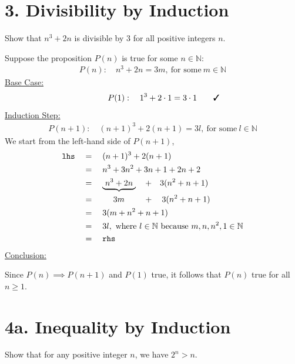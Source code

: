 \documentclass[12pt]{article}
\begin{document}
\clearpage
\section*{3. Divisibility by Induction}
\begin{question}
Show that $n^{3}+2n$ is divisible by $3$ for all positive integers $n$. 
\end{question}

Suppose the proposition $P(n)$ is true for some $n\in\mathbb{N}$: 
\begin{align*}
P(n): \quad n^{3}+2n = 3m, ~\text{for some}~m\in\mathbb{N}
\end{align*}
\underline{Base Case:}
\begin{align*}
P(1): \quad
  1^{3} + 2\cdot 1 = 3 \cdot 1 \mathrlap{\qquad \cmark}
\end{align*}
\underline{Induction Step:}
\begin{align*}
P(n+1): \quad
  (n+1)^{3}+2(n+1) = 3l, ~\text{for some}~l\in\mathbb{N}
\end{align*}
We start from the left-hand side of $P(n+1)$,
\begin{align*}
\texttt{lhs} \quad
& = \quad (n+1)^{3} + 2(n+1) \\
& = \quad n^{3} + 3n^{2} + 3n + 1 + 2n + 2 \\
& = \quad \underbrace{~n^{3} + 2n~} \quad+\quad 3(n^{2}+n+1) \\
& = \quad \makebox[4em]{$3m$} \quad+\quad 3(n^{2}+n+1) \\
& = \quad 3 (m+n^{2}+n+1) \\
& = \quad 3l, ~\text{where}~l\in\mathbb{N}~\text{because}~m,n,n^{2},1\in\mathbb{N} \\
& = \quad \texttt{rhs}
\end{align*}
\underline{Conclusion:}

Since $P(n)\implies P(n+1)$ and $P(1)$ true, it follows that $P(n)$ true for all $n\geq1$.

\clearpage
\section*{4a. Inequality by Induction}
\begin{question}
Show that for any positive integer $n$, we have $2^{n}>n$.
\end{question}
\end{document}
